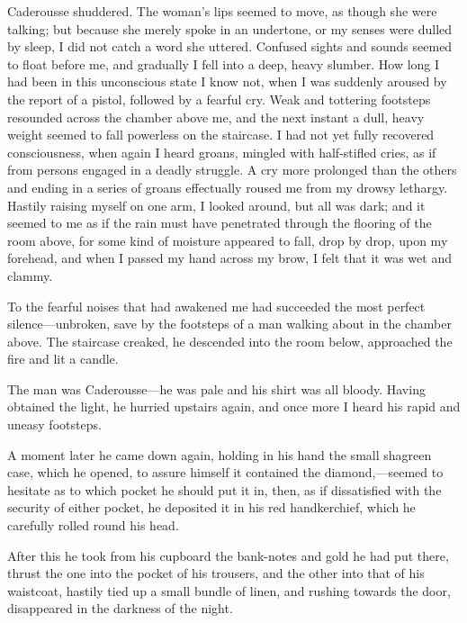  Caderousse shuddered. The woman's lips seemed to move, as though she were talking; but because she merely spoke in an undertone, or my senses were dulled by sleep, I did not catch a word she uttered. Confused sights and sounds seemed to float before me, and gradually I fell into a deep, heavy slumber. How long I had been in this unconscious state I know not, when I was suddenly aroused by the report of a pistol, followed by a fearful cry. Weak and tottering footsteps resounded across the chamber above me, and the next instant a dull, heavy weight seemed to fall powerless on the staircase. I had not yet fully recovered consciousness, when again I heard groans, mingled with half-stifled cries, as if from persons engaged in a deadly struggle. A cry more prolonged than the others and ending in a series of groans effectually roused me from my drowsy lethargy. Hastily raising myself on one arm, I looked around, but all was dark; and it seemed to me as if the rain must have penetrated through the flooring of the room above, for some kind of moisture appeared to fall, drop by drop, upon my forehead, and when I passed my hand across my brow, I felt that it was wet and clammy. 

 To the fearful noises that had awakened me had succeeded the most perfect silence—unbroken, save by the footsteps of a man walking about in the chamber above. The staircase creaked, he descended into the room below, approached the fire and lit a candle. 

 The man was Caderousse—he was pale and his shirt was all bloody. Having obtained the light, he hurried upstairs again, and once more I heard his rapid and uneasy footsteps. 

 A moment later he came down again, holding in his hand the small shagreen case, which he opened, to assure himself it contained the diamond,—seemed to hesitate as to which pocket he should put it in, then, as if dissatisfied with the security of either pocket, he deposited it in his red handkerchief, which he carefully rolled round his head. 

 After this he took from his cupboard the bank-notes and gold he had put there, thrust the one into the pocket of his trousers, and the other into that of his waistcoat, hastily tied up a small bundle of linen, and rushing towards the door, disappeared in the darkness of the night. 

